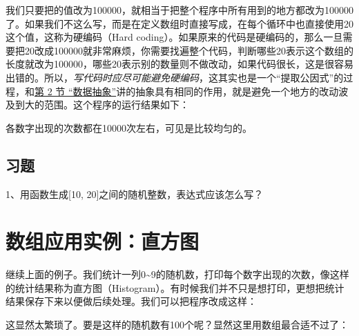 


我们只要把的值改为100000，就相当于把整个程序中所有用到的地方都改为100000了。如果我们不这么写，而是在定义数组时直接写成，在每个循环中也直接使用20这个值，这称为硬编码（Hard coding）。如果原来的代码是硬编码的，那么一旦需要把20改成100000就非常麻烦，你需要找遍整个代码，判断哪些20表示这个数组的长度就改为100000，哪些20表示别的数量则不做改动，如果代码很长，这是很容易出错的。所以，\emph{写代码时应尽可能避免硬编码}，这其实也是一个“提取公因式”的过程，和\hyperlink{db.ch07s02.id2730921}{第 2 节 “数据抽象”}讲的抽象具有相同的作用，就是避免一个地方的改动波及到大的范围。这个程序的运行结果如下：




各数字出现的次数都在10000次左右，可见是比较均匀的。


\subsection*{习题}
%


1、用函数生成[10, 20]之间的随机整数，表达式应该怎么写？




\section{数组应用实例：直方图}
%
继续上面的例子。我们统计一列0\textasciitilde{}\BookSplit{}9的随机数，打印每个数字出现的次数，像这样的统计结果称为直方图（Histogram）。有时候我们并不只是想打印，更想把统计结果保存下来以便做后续处理。我们可以把程序改成这样：




这显然太繁琐了。要是这样的随机数有100个呢？显然这里用数组最合适不过了：


